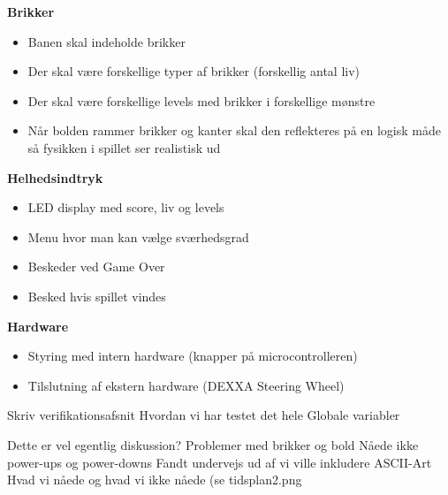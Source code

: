 \textbf{Brikker}
\begin{itemize}
\item Banen skal indeholde brikker
\item Der skal være forskellige typer af brikker (forskellig antal liv)
\item Der skal være forskellige levels med brikker i forskellige mønstre
\item Når bolden rammer brikker og kanter skal den reflekteres på en logisk måde så fysikken i spillet ser realistisk ud
\end{itemize}

\textbf{Helhedsindtryk}
\begin{itemize}
\item LED display med score, liv og levels
\item Menu hvor man kan vælge sværhedsgrad
\item Beskeder ved Game Over
\item Besked hvis spillet vindes
\end{itemize}

\textbf{Hardware}
\begin{itemize}
\item Styring med intern hardware (knapper på microcontrolleren)
\item Tilslutning af ekstern hardware (DEXXA Steering Wheel)
\end{itemize}

Skriv verifikationsafsnit
	Hvordan vi har testet det hele
	Globale variabler
	
	
	
	
	
Dette er vel egentlig diskussion?
	Problemer med brikker og bold
	Nåede ikke power-ups og power-downs
	Fandt undervejs ud af vi ville inkludere ASCII-Art
	Hvad vi nåede og hvad vi ikke nåede (se tidsplan2.png
	
